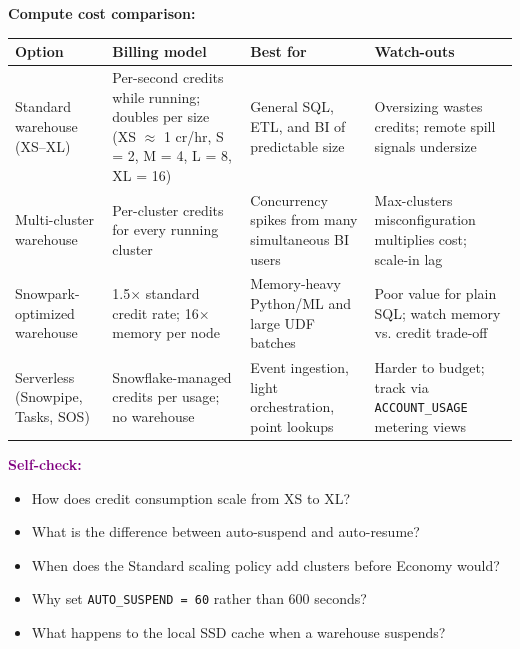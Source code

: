 \documentclass[11pt, a4paper]{article}
\newcommand{\selfcheck}[1]{\vspace{1mm}\noindent\textbf{\textcolor{purple}{Self-check:}} #1}
\begin{document}
\vspace{1mm}
\noindent\textbf{Compute cost comparison:}
\begin{center}
\renewcommand{\arraystretch}{1.3}
\begin{tabular}{@{} l p{3.8cm} p{3.6cm} p{4.2cm} @{}}
\toprule
\textbf{Option} & \textbf{Billing model} & \textbf{Best for} & \textbf{Watch-outs} \\
\midrule
Standard warehouse (XS--XL) & Per-second credits while running; doubles per size (XS $\approx$ 1 cr/hr, S = 2, M = 4, L = 8, XL = 16) & General SQL, ETL, and BI of predictable size & Oversizing wastes credits; remote spill signals undersize \\
Multi-cluster warehouse & Per-cluster credits for every running cluster & Concurrency spikes from many simultaneous BI users & Max-clusters misconfiguration multiplies cost; scale-in lag \\
Snowpark-optimized warehouse & 1.5$\times$ standard credit rate; 16$\times$ memory per node & Memory-heavy Python/ML and large UDF batches & Poor value for plain SQL; watch memory vs. credit trade-off \\
Serverless (Snowpipe, Tasks, SOS) & Snowflake-managed credits per usage; no warehouse & Event ingestion, light orchestration, point lookups & Harder to budget; track via \texttt{ACCOUNT\_USAGE} metering views \\
\bottomrule
\end{tabular}
\end{center}

\selfcheck{\begin{itemize}[label=-, nosep, leftmargin=4mm]
    \item How does credit consumption scale from XS to XL?
    \item What is the difference between auto-suspend and auto-resume?
    \item When does the Standard scaling policy add clusters before Economy would?
    \item Why set \texttt{AUTO\_SUSPEND = 60} rather than 600 seconds?
    \item What happens to the local SSD cache when a warehouse suspends?
\end{itemize}}
\end{document}
